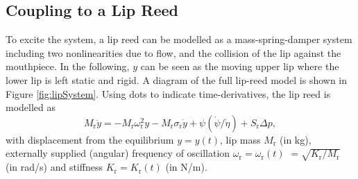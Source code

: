 



\subsection{Coupling to a Lip Reed}\label{sec:lipReed}
To excite the system, a lip reed can be modelled as a mass-spring-damper system including two nonlinearities due to flow, and the collision of the lip against the mouthpiece. In the following, $y$ can be seen as the moving upper lip where the lower lip is left static and rigid. A diagram of the full lip-reed model is shown in Figure \ref{fig:lipSystem}. Using dots to indicate time-derivatives, the lip reed is modelled as
\begin{equation}\label{eq:lipReedCont}
    M_\text{r}\ddot y = -M_\text{r}\omega_\text{r}^2 y - M_\text{r} \sigma_\text{r} \dot y +\psi(\dot \psi/
\dot \eta)+ S_\text{r}\Delta p,
\end{equation}
with displacement from the equilibrium $y = y(t)$, lip mass $M_\text{r}$ (in kg), externally supplied (angular) frequency of oscillation $\omega_\text{r} = \omega_\text{r}(t)$ $= \sqrt{K_\text{r}/M_\text{r}}$ (in rad/s) and stiffness $K_\text{r}= K_\text{r}(t)$ (in N/m).

